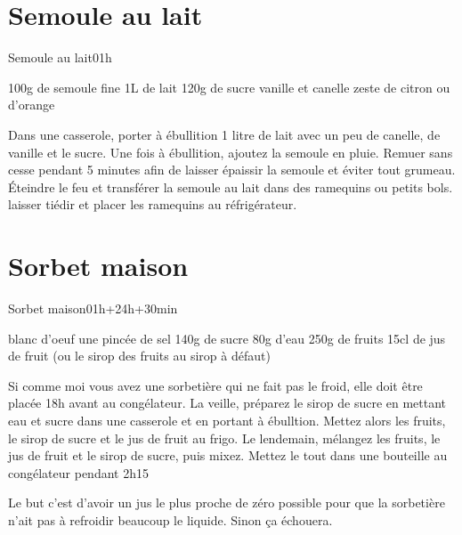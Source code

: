 {\section{Semoule au lait}
\begin{recette}{Semoule au lait}{0}{1h}{}
\begin{ingredients}[4 pers.]
\ingredient 100g de semoule fine
\ingredient 1L de lait
\ingredient 120g de sucre
\ingredient vanille et canelle
\ingredient zeste de citron ou d'orange
\end{ingredients}

\begin{preparation}
\etape Dans une casserole, porter à ébullition 1 litre de lait avec un peu de canelle, de vanille et le sucre. Une fois à ébullition, ajoutez la semoule en pluie.
\etape Remuer sans cesse pendant 5 minutes afin de laisser épaissir la semoule et éviter tout grumeau.
\etape Éteindre le feu et transférer la semoule au lait dans des ramequins ou petits bols. laisser tiédir et placer les ramequins au réfrigérateur.
\end{preparation}
\end{recette}

\section{Sorbet maison}
\begin{recette}{Sorbet maison}{0}{1h+24h+30min}{}
\begin{ingredients}
 blanc d'oeuf
\ingredient une pincée de sel
\ingredient 140g de sucre
\ingredient 80g d'eau
\ingredient 250g de fruits
\ingredient 15cl de jus de fruit (ou le sirop des fruits au sirop à défaut)
\end{ingredients}

\begin{preparation}
\etape Si comme moi vous avez une sorbetière qui ne fait pas le froid, elle doit être placée 18h avant au congélateur. 
\etape La veille, préparez le sirop de sucre en mettant eau et sucre dans une casserole et en portant à ébulltion. 
\etape Mettez alors les fruits, le sirop de sucre et le jus de fruit au frigo. 
\etape Le lendemain, mélangez les fruits, le jus de fruit et le sirop de sucre, puis mixez. 
\etape Mettez le tout dans une bouteille au congélateur pendant 2h15
\begin{remarque}
Le but c'est d'avoir un jus le plus proche de zéro possible pour que la sorbetière n'ait pas à refroidir beaucoup le liquide. Sinon ça échouera.
\end{remarque}


\end{preparation}
\end{recette}}
